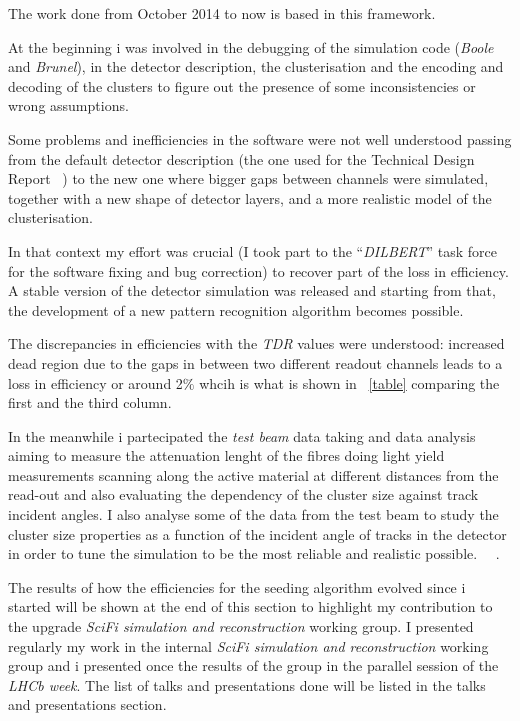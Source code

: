\documentclass[paper=a4, fontsize=10pt]{scrartcl}
\numberwithin{equation}{section}		%
\numberwithin{figure}{section}			%
\numberwithin{table}{section}				%
\begin{document}
The work done from October 2014 to now is based in this framework. 

At the beginning i was involved in the debugging of the simulation code (\textit{Boole} and \textit{Brunel}), in the detector description, the clusterisation and the encoding and decoding of the clusters to figure out the presence of some inconsistencies or wrong assumptions.

Some problems and inefficiencies in the software were not well understood passing from the default detector description (the one used for the Technical Design Report ~\cite{SciFiTDR}) to the new one where bigger gaps between channels were simulated, together with a new shape of detector layers, and a more realistic model of the clusterisation. 

In that context my effort was crucial (I took part to the ``\textit{DILBERT}'' task force for the software fixing and bug correction) to recover part of the loss in efficiency. A stable version of the detector simulation was released and starting from that, the development of a new pattern recognition algorithm becomes possible. 

The discrepancies in efficiencies with the \textit{TDR} values were understood: increased dead region due to the gaps in between two different readout channels leads to a loss in efficiency or around 2$\%$ whcih is what is shown in ~\ref{table} comparing the first and the third column.

In the meanwhile i partecipated the \textit{test beam} data taking and data analysis aiming to measure the attenuation lenght of the fibres doing light yield measurements scanning along the active material at different distances from the read-out and also evaluating the dependency of the cluster size against track incident angles. I also analyse some of the data from the test beam to study the cluster size properties as a function of the incident angle of tracks in the detector in order to tune the simulation to be the most reliable and realistic possible. ~\cite{AnalysisOrsay}~\cite{OrsayTestBeam}.




The results of how the efficiencies for the seeding algorithm evolved since i started will be shown at the end of this section to highlight my contribution to the upgrade \textit{SciFi simulation and reconstruction} working group. I presented regularly my work in the internal \textit{SciFi simulation and reconstruction} working group and i presented once the results of the group in the parallel session of the \textit{LHCb week}. The list of talks and presentations done will be listed in the talks and presentations section. 
\end{document}

